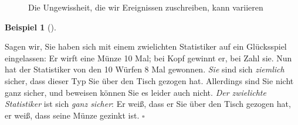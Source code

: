 \documentclass[
  letterpaper,
  twoside,
  open=any]{scrbook}
\theoremstyle{definition}
\theoremstyle{definition}
\newtheorem{example}{Beispiel}[chapter]
\theoremstyle{definition}
\theoremstyle{remark}
\begin{document}
\begin{figure}

\begin{minipage}{0.50\linewidth}



\end{minipage}%
%
\begin{minipage}{0.50\linewidth}



\end{minipage}%

\caption{\label{fig-ungewiss-anna-berta}Die Ungewissheit, die wir
Ereignissen zuschreiben, kann variieren}

\end{figure}%

\begin{example}[]\protect\hypertarget{exm-ungewiss2}{}\label{exm-ungewiss2}

Sagen wir, Sie haben sich mit einem zwielichten Statistiker auf ein
Glücksspiel eingelassen: Er wirft eine Münze 10 Mal; bei Kopf gewinnt
er, bei Zahl sie. Nun hat der Statistiker von den 10 Würfen 8 Mal
gewonnen. \emph{Sie} sind sich \emph{ziemlich} sicher, dass dieser Typ
Sie über den Tisch gezogen hat. Allerdings sind Sie nicht ganz sicher,
und beweisen können Sie es leider auch nicht. \emph{Der zwielichte
Statistiker} ist sich \emph{ganz sicher}: Er weiß, dass er Sie über den
Tisch gezogen hat, er weiß, dass seine Münze gezinkt ist. \(\square\)

\end{example}
\end{document}
